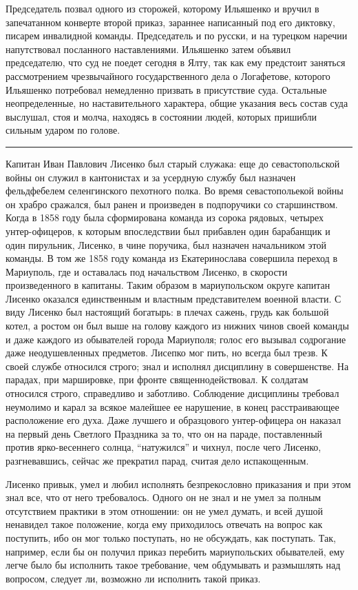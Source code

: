 \documentclass[a4paper,20pt]{report}
\begin{document}
Председатель позвал одного из сторожей, которому Ильяшенко и вручил в
запечатанном конверте второй приказ, зараннее написанный под его диктовку,
писарем инвалидной команды. Председатель и по русски, и на турецком наречии
напутствовал посланного наставлениями. Ильяшенко затем объявил председателю,
что суд не поедет сегодня в Ялту, так как ему предстоит заняться рассмотрением
чрезвычайного государственного дела о Логафетове, которого Ильяшенко потребовал
немедленно призвать в присутствие суда. Остальные неопределенные, но
наставительного характера, общие указания весь состав суда выслушал, стоя и
молча, находясь в состоянии людей, которых пришибли сильным ударом по голове.

\par\noindent\rule{\textwidth}{0.4pt}

Капитан Иван Павлович Лисенко был старый служака: еще до севастопольской войны
он служил в кантонистах и за усердную службу был назначен фельдфебелем
селенгинского пехотного полка. Во время севастопольекой
войны он храбро сражался, был ранен и произведен в
подпоручики со старшинством. Когда в 1858 году была
сформирована команда из сорока рядовых, четырех унтер-офицеров, к которым впоследствии был прибавлен один
барабанщик и один пирульник, Лисенко, в чине поручика, был назначен начальником этой команды. В том 
же 1858 году команда из Екатеринослава совершила переход в Мариуполь, 
где и оставалась под начальством
Лисенко, в скорости произведенного в капитаны. Таким
образом в мариупольском округе капитан Лисенко оказался единственным и 
властным представителем военной
власти. С виду Лисенко был настоящий богатырь: в плечах сажень, 
грудь как большой котел, а ростом он
был выше на голову каждого из нижних чинов своей
команды и даже каждого из обывателей города Мариуполя;
голос его вызывал содрогание даже неодушевленных предметов. 
Лисепко мог пить, но всегда был трезв. К своей
службе относился строго; знал и исполнял дисциплину
в совершенстве. На парадах, при маршировке, при фронте
священнодействовал. К солдатам относился строго, справедливо и заботливо. Соблюдение дисциплины требовал
неумолимо и карал за всякое малейшее ее нарушение, в конец расстраивающее расположение его духа. Даже 
лучшего и образцового унтер-офицера он наказал на первый день Светлого Праздника за то, что он 
на параде, поставленный против ярко-весеннего солнца, ``натужился'' и чихнул, после чего Лисенко, разгневавшись, сейчас
же прекратил парад, считая дело испакощенным. 

Лисенко привык, умел и любил исполнять безпрекословно приказания и при этом
знал все, что от него требовалось. Одного он не знал и не умел за полным
отсутствием  практики в этом отношении: он не умел думать, и всей душой
ненавидел такое положение, когда ему приходилось отвечать на вопрос как
поступить, ибо он мог только поступать, но не обсуждать, как поступать. Так,
например, если бы он получил приказ перебить мариупольских обывателей, ему
легче было бы исполнить такое требование, чем обдумывать и размышлять над
вопросом, следует ли, возможно ли исполнить такой приказ.
\end{document}
